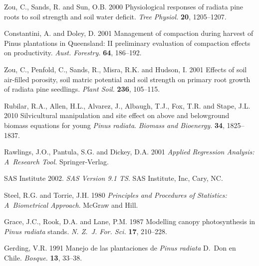\documentclass[final]{foresj}
\begin{document}
\begin{thebibliography}
Zou, C., Sands, R. and Sun, O.B. 2000 Physiological
responses of radiata pine roots to soil strength and soil
water deficit. \textit{Tree Physiol.} \textbf{20},
1205--1207.\vspace*{0.5pt}

Constantini, A. and Doley, D. 2001 Management of compaction
during harvest of Pinus plantations in Queensland: II
preliminary evaluation of compaction effects on
productivity. \textit{Aust. Forestry.} \textbf{64},
186--192.\vspace*{0.5pt}

Zou, C., Penfold, C., Sands, R., Misra, R.K. and Hudson, I.
2001 Effects of soil air-filled porosity, soil matric
potential and soil strength on primary root growth of
radiata pine seedlings. \textit{Plant Soil.} \textbf{236},
105--115.\vspace*{0.5pt}

Rubilar, R.A., Allen, H.L., Alvarez, J., Albaugh, T.J.,
Fox, T.R. and Stape, J.L. 2010 Silvicultural manipulation
and site effect on above and belowground biomass equations
for young \textit{Pinus radiata}. \textit{Biomass and
Bioenergy.} \textbf{34}, 1825--1837.\vspace*{0.5pt}

Rawlings, J.O., Pantula, S.G. and Dickey, D.A. 2001
\textit{Applied Regression Analysis: A~Research Tool.}
Springer-Verlag.\vspace*{0.5pt}

SAS Institute 2002. \textit{SAS Version 9.1 TS}. SAS
Institute, Inc, Cary, NC.\vspace*{0.5pt}

Steel, R.G. and Torrie, J.H. 1980 \textit{Principles and
Procedures of Statistics: A~Biometrical Approach}. McGraw
and Hill.\vspace*{0.5pt}

Grace, J.C., Rook, D.A. and Lane, P.M. 1987 Modelling
canopy photosynthesis in \textit{Pinus radiata} stands.
\textit{N. Z.~J. For. Sci.} \textbf{17}, 210--228.\vspace*{0.5pt}

Gerding, V.R. 1991 Manejo de las plantaciones de
\textit{Pinus radiata} D.~Don en Chile. \textit{Bosque.}
\textbf{13}, 33--38.\vspace*{0.5pt}


\end{thebibliography}
\end{document}
